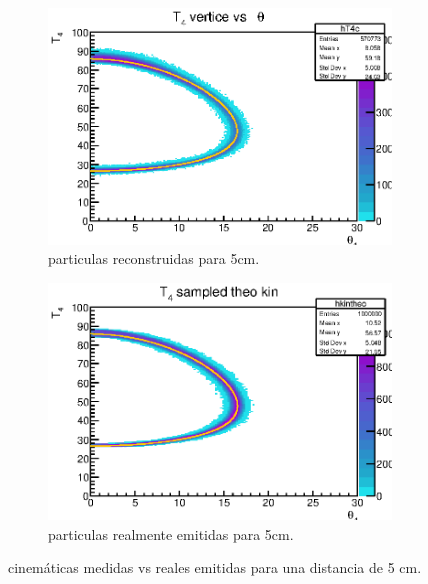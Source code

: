 \documentclass[12pt,a4paper]{article}
\numberwithin{equation}{section}
\numberwithin{figure}{section}
\begin{document}
\begin{figure}[h!] \centering
    \begin{subfigure}[b]{0.45\linewidth} \centering
        \includegraphics[scale=0.8]{5_measured_kin.eps}
        \caption{particulas reconstruidas para 5cm.}
        \label{Fig:2.3.01-measured-5}
    \end{subfigure}
    \begin{subfigure}[b]{0.45\linewidth} \centering
        \includegraphics[scale=0.8]{5_simulation_kin.eps}
        \caption{particulas realmente emitidas para 5cm.}
        \label{Fig:2.3.01-theo-5}
    \end{subfigure}
    \caption{cinemáticas medidas vs reales emitidas para una distancia de 5 cm.}
\end{figure}
    
\end{document}
